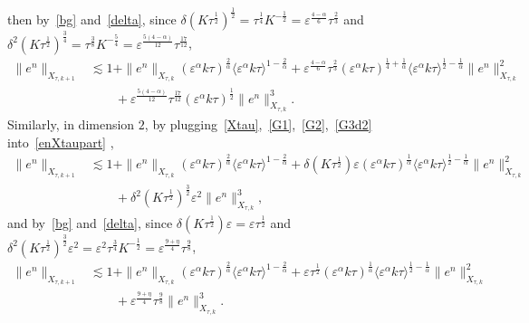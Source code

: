 \documentclass[10pt,a4paper]{article}
\begin{document}
  then by~\eqref{bg} and~\eqref{delta}, since \(\delta(K\tau^\frac12)^\frac12 = 
  \tau^\frac14 K^{-\frac12} = \varepsilon^\frac{4-\alpha}6\tau^\frac23\) and 
  \(\delta^2(K\tau^\frac12)^\frac34 = \tau^\frac38K^{-\frac54} = 
  \varepsilon^\frac{5(4-\alpha)}{12}\tau^\frac{17}{12}\),
  \begin{equation}\label{eXtaud1}
    \begin{aligned}
      \|e^n\|_{X_{\tau,k+1}} &\lesssim 1 + \|e^n\|_{X_{\tau,k}} 
      (\varepsilon^\alpha k\tau)^\frac2\alpha \langle\varepsilon^\alpha k\tau\rangle^{1-\frac2\alpha} %
      + \varepsilon^\frac{4-\alpha}6\tau^\frac23 (\varepsilon^\alpha k\tau)^{\frac14+\frac1\alpha}
      \langle\varepsilon^\alpha k\tau\rangle^{\frac12-\frac1\alpha} \|e^n\|_{X_{\tau,k}}^2 \\
      & \qquad + \varepsilon^\frac{5(4-\alpha)}{12}\tau^\frac{17}{12} 
      (\varepsilon^\alpha k\tau)^\frac12 \|e^n\|_{X_{\tau,k}}^3.
    \end{aligned}
  \end{equation}
  Similarly, in dimension \(2\), by plugging~\eqref{Xtau},~\eqref{G1},~\eqref{G2},~\eqref{G3d2} 
  into~\eqref{enXtaupart} ,
  \begin{equation*}
    \begin{aligned}
      \|e^n\|_{X_{\tau,k+1}} &\lesssim 1 + \|e^n\|_{X_{\tau,k}} 
      (\varepsilon^\alpha k\tau)^\frac2\alpha \langle\varepsilon^\alpha k\tau\rangle^{1-\frac2\alpha} %
      + \delta(K\tau^\frac12) \varepsilon (\varepsilon^\alpha k\tau)^\frac1\alpha
      \langle\varepsilon^\alpha k\tau\rangle^{\frac12-\frac1\alpha} \|e^n\|_{X_{\tau,k}}^2 \\
      & \qquad + \delta^2(K\tau^\frac12)^\frac32 \varepsilon^2 
      \|e^n\|_{X_{\tau,k}}^3,
    \end{aligned}
  \end{equation*}
  and by~\eqref{bg} and~\eqref{delta}, since 
  \(\delta(K\tau^\frac12) \varepsilon = \varepsilon\tau^\frac12\) and
  \(\delta^2(K\tau^\frac12)^\frac32 \varepsilon^2 =
  \varepsilon^2\tau^\frac34K^{-\frac12} = 
  \varepsilon^\frac{9+\eta}4\tau^\frac98\),
  \begin{equation}\label{eXtaud2}
    \begin{aligned}
      \|e^n\|_{X_{\tau,k+1}} &\lesssim 1 + \|e^n\|_{X_{\tau,k}} 
      (\varepsilon^\alpha k\tau)^\frac2\alpha \langle\varepsilon^\alpha k\tau\rangle^{1-\frac2\alpha} %
      + \varepsilon\tau^\frac12 (\varepsilon^\alpha k\tau)^\frac1\alpha
      \langle\varepsilon^\alpha k\tau\rangle^{\frac12-\frac1\alpha} \|e^n\|_{X_{\tau,k}}^2 \\
      & \qquad + \varepsilon^\frac{9+\eta}4\tau^\frac98 \|e^n\|_{X_{\tau,k}}^3 .
    \end{aligned}
  \end{equation}
\end{document}

